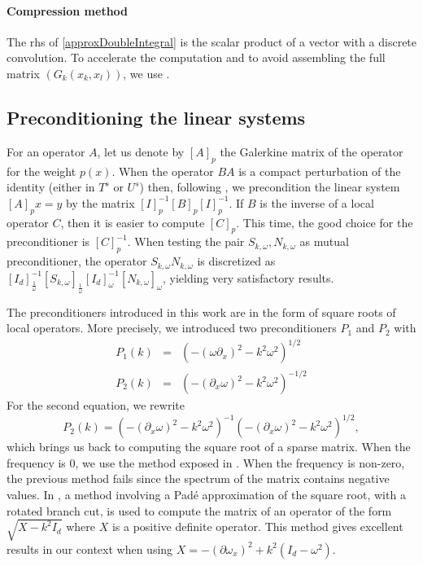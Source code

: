 \documentclass[a4paper]{article}
\begin{document}
\paragraph{Compression method} The rhs of \eqref{approxDoubleIntegral} is the scalar product of a vector with a discrete convolution. To accelerate the computation and to avoid assembling the full matrix $(G_k(x_k,x_l))$, we use . 

\subsection{Preconditioning the linear systems}

For an operator $A$, let us denote by $\left[A\right]_p$ the Galerkine matrix of the operator for the weight $p(x)$. When the operator $BA$ is a compact perturbation of the identity (either in $T^s$ or $U^s$) then, following \cite{steinbach1998construction}, we precondition the linear system $\left[A\right]_p x = y$ by the matrix $\left[I\right]^{-1}_p \left[B\right]_p \left[I\right]_p^{-1}$. If $B$ is the inverse of a local operator $C$, then it is easier to compute $\left[C\right]_p$. This time, the good choice for the preconditioner is $\left[C\right]_p^{-1}$. When testing the pair $S_{k,\omega}, N_{k,\omega}$ as mutual preconditioner, the operator $S_{k,\omega}N_{k,\omega}$ is discretized as $\left[I_d\right]_\frac{1}{\omega}^{-1} \left[S_{k,\omega}\right]_\frac{1}{\omega}\left[I_d\right]_{\omega}^{-1}\left[N_{k,\omega}\right]_\omega$, yielding very satisfactory results. 

The preconditioners introduced in this work are in the form of square roots of local operators. More precisely, we introduced two preconditioners $P_1$ and $P_2$ with 
\begin{eqnarray*}
	P_1(k) &=& \left(-(\omega \partial_x)^2 - k^2 \omega^2\right)^{1/2}\\
	P_2(k) &=& \left(-(\partial_x \omega)^2 - k^2 \omega^2 \right)^{-1/2}
\end{eqnarray*}
For the second equation, we rewrite 
\[P_2(k) = \left(-(\partial_x \omega)^2 - k^2 \omega^2 \right)^{-1} \left(-(\partial_x \omega)^2 - k^2 \omega^2 \right)^{1/2},\]
which brings us back to computing the square root of a sparse matrix. When the frequency is $0$, we use the method exposed in \cite{hale2008computing}. When the frequency is non-zero, the previous method fails since the spectrum of the matrix contains negative values. In \cite{antoine2007generalized}, a method involving a Padé approximation of the square root, with a rotated branch cut, is used to compute the matrix of an operator of the form $\sqrt{X - k^2 I_d}$ where $X$ is a positive definite operator. This method gives excellent results in our context when using $X = -(\partial \omega_x)^2 + k^2 \left(I_d - \omega^2\right)$. 
\end{document}
